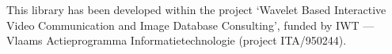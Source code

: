 \medskip

This library has been developed within the project `Wavelet Based Interactive
Video Communication and Image Database Consulting', funded by IWT --- Vlaams
Actieprogramma Informatietechnologie (project ITA/950244).

\vfill

\begin{center}
\end{center}
